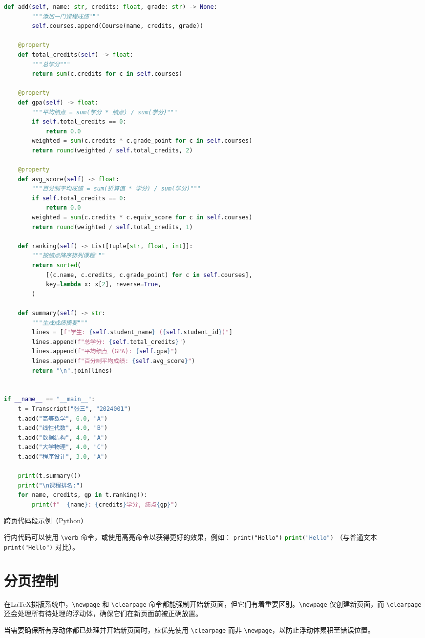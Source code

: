\begin{longlisting}
\begin{lstlisting}[language=Python]
    def add(self, name: str, credits: float, grade: str) -> None:
        """添加一门课程成绩"""
        self.courses.append(Course(name, credits, grade))

    @property
    def total_credits(self) -> float:
        """总学分"""
        return sum(c.credits for c in self.courses)

    @property
    def gpa(self) -> float:
        """平均绩点 = sum(学分 * 绩点) / sum(学分)"""
        if self.total_credits == 0:
            return 0.0
        weighted = sum(c.credits * c.grade_point for c in self.courses)
        return round(weighted / self.total_credits, 2)

    @property
    def avg_score(self) -> float:
        """百分制平均成绩 = sum(折算值 * 学分) / sum(学分)"""
        if self.total_credits == 0:
            return 0.0
        weighted = sum(c.credits * c.equiv_score for c in self.courses)
        return round(weighted / self.total_credits, 1)

    def ranking(self) -> List[Tuple[str, float, int]]:
        """按绩点降序排列课程"""
        return sorted(
            [(c.name, c.credits, c.grade_point) for c in self.courses],
            key=lambda x: x[2], reverse=True,
        )

    def summary(self) -> str:
        """生成成绩摘要"""
        lines = [f"学生: {self.student_name} ({self.student_id})"]
        lines.append(f"总学分: {self.total_credits}")
        lines.append(f"平均绩点 (GPA): {self.gpa}")
        lines.append(f"百分制平均成绩: {self.avg_score}")
        return "\n".join(lines)


if __name__ == "__main__":
    t = Transcript("张三", "2024001")
    t.add("高等数学", 6.0, "A")
    t.add("线性代数", 4.0, "B")
    t.add("数据结构", 4.0, "A")
    t.add("大学物理", 4.0, "C")
    t.add("程序设计", 3.0, "A")

    print(t.summary())
    print("\n课程排名:")
    for name, credits, gp in t.ranking():
        print(f"  {name}: {credits}学分, 绩点{gp}")
\end{lstlisting}
\fi
\caption{跨页代码段示例（Python）}\label{lst:cross-page}
\end{longlisting}
\makeatother

行内代码可以使用 \verb|\verb| 命令，或使用高亮命令以获得更好的效果，例如：
\makeatletter
\iftongjithesis@minted
  \texttt{print("Hello")}
\else
  \lstinline[language=Python]{print("Hello")}
\fi
\makeatother
（与普通文本 \verb|print("Hello")| 对比）。

\section{分页控制}

在\LaTeX{}排版系统中，\verb|\newpage| 和 \verb|\clearpage| 命令都能强制开始新页面，但它们有着重要区别。\verb|\newpage| 仅创建新页面，而 \verb|\clearpage| 还会处理所有待处理的浮动体，确保它们在新页面前被正确放置。

当需要确保所有浮动体都已处理并开始新页面时，应优先使用 \verb|\clearpage| 而非 \verb|\newpage|，以防止浮动体累积至错误位置。
